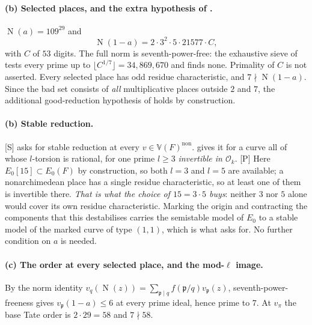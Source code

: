 \documentclass[11pt]{article}
\theoremstyle{plain}
\theoremstyle{definition}
\newcommand{\Norm}{\operatorname{N}}
\begin{document}
\paragraph{(b) Selected places, and the extra hypothesis of \cite{IUT4}.}
$\Norm(a)=109^{29}$ and
\[
 \Norm(1-a)=2\cdot3^2\cdot5\cdot21577\cdot C,
\]
with $C$ of $53$ digits.  The full norm is seventh-power-free: the exhaustive sieve
of  tests every prime up to
$\lfloor C^{1/7}\rfloor=34{,}869{,}670$ and finds none.  Primality of $C$ is not
asserted.  Every selected place has odd residue characteristic, and
$7\nmid\Norm(1-a)$.  Since the bad set consists of \emph{all} multiplicative
places outside $2$ and $7$, the additional good-reduction hypothesis of
\cite[Thm.~1.10]{IUT4} holds by construction.

\paragraph{(b) Stable reduction.}
\textup{[S]} \cite[Def.~3.1(b)]{IUT1} asks for stable reduction at every
$v\in\mathbb V(F)^{\mathrm{non}}$.  \cite[Prop.~1.8(v)]{IUT4} gives it for a curve all
of whose $l$-torsion is rational, for one prime $l\ge3$ \emph{invertible in
$\mathcal{O}_k$}.  \textup{[P]} Here $E_0[15]\subset E_0(F)$ by construction, so both
$l=3$ and $l=5$ are available; a nonarchimedean place has a single residue
characteristic, so at least one of them is invertible there.  \emph{That is what the
choice of $15=3\cdot5$ buys}: neither $3$ nor $5$ alone would cover its own residue
characteristic.  Marking the origin and contracting the components that this
destabilises carries the semistable model of $E_0$ to a stable model of the marked
curve of type $(1,1)$, which is what \cite[Def.~3.1(b)]{IUT1} asks for.  No further
condition on $a$ is needed.

\paragraph{(c) The order at every selected place, and the mod-$\ell$ image.}
By the norm identity
$v_q(\Norm(z))=\sum_{\mathfrak p\mid q}f(\mathfrak p/q)v_{\mathfrak p}(z)$,
seventh-power-freeness gives $v_{\mathfrak p}(1-a)\le6$ at every prime ideal, hence
prime to $7$.  At $v_\pi$ the base Tate order is $2\cdot29=58$ and $7\nmid58$.
\end{document}
